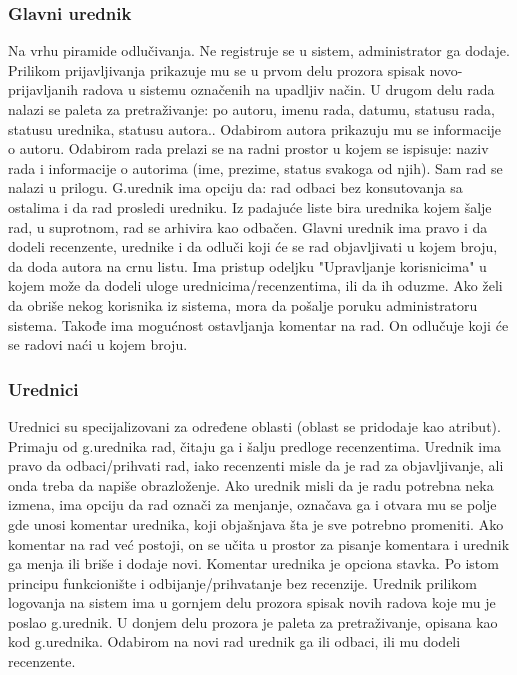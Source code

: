 \documentclass[a4paper]{article}
\begin{document}
    \subsubsection{Glavni urednik}
    Na vrhu piramide odlučivanja. Ne registruje se u sistem, administrator ga dodaje. Prilikom prijavljivanja prikazuje mu se u prvom delu prozora spisak novo-prijavljanih radova u sistemu označenih na upadljiv način. U drugom delu rada nalazi se paleta za pretraživanje: po autoru, imenu rada, datumu, statusu rada, statusu urednika, statusu autora.. Odabirom autora prikazuju mu se informacije o autoru. Odabirom rada prelazi se na radni prostor u kojem se ispisuje: naziv rada i informacije o autorima (ime, prezime, status svakoga od njih). Sam rad se nalazi u prilogu. G.urednik ima opciju da: rad odbaci bez konsutovanja sa ostalima i da rad prosledi uredniku. Iz padajuće liste bira urednika kojem šalje rad, u suprotnom, rad se arhivira kao odbačen. Glavni urednik ima pravo i da dodeli recenzente, urednike i da odluči koji će se rad objavljivati u kojem broju, da doda autora na crnu listu. Ima pristup odeljku "Upravljanje korisnicima" u kojem može da dodeli uloge urednicima/recenzentima, ili da ih oduzme. Ako želi da obriše nekog korisnika iz sistema, mora da pošalje poruku administratoru sistema. Takođe ima mogućnost ostavljanja komentar na rad. On odlučuje koji će se radovi naći u kojem broju.
    
    \subsubsection{Urednici}
    Urednici su specijalizovani za određene oblasti (oblast se pridodaje kao atribut). Primaju od g.urednika rad, čitaju ga i šalju predloge recenzentima. Urednik ima pravo da odbaci/prihvati rad, iako recenzenti misle da je rad za objavljivanje, ali onda treba da napiše obrazloženje. Ako urednik misli da je radu potrebna neka izmena, ima opciju da rad označi za menjanje, označava ga i otvara mu se polje gde unosi komentar urednika, koji objašnjava šta je sve potrebno promeniti. Ako komentar  na rad već postoji, on se učita u prostor za pisanje komentara i urednik ga menja ili briše i dodaje novi. Komentar urednika je opciona stavka. Po istom principu funkcionište i odbijanje/prihvatanje bez recenzije. Urednik prilikom logovanja na sistem ima u gornjem delu prozora spisak novih radova koje mu je poslao g.urednik. U donjem delu prozora je paleta za pretraživanje, opisana kao kod g.urednika. Odabirom na novi rad urednik ga ili odbaci, ili mu dodeli recenzente.
    
\end{document}
